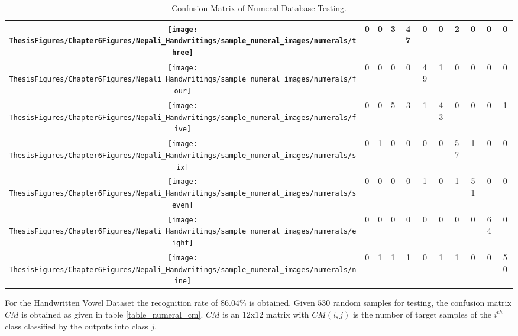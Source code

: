 \begin{table}[h]
\begin{tabular}{|c|c|c|c|c|c|c|c|c|c|c|}
\hline 
\texttt{[image: ThesisFigures/Chapter6Figures/Nepali\_Handwritings/sample\_numeral\_images/numerals/three]} & 0 & 0 & 3 & 47 & 0 & 0 & 2 & 0 & 0 & 0\tabularnewline
\hline 
\texttt{[image: ThesisFigures/Chapter6Figures/Nepali\_Handwritings/sample\_numeral\_images/numerals/four]} & 0 & 0 & 0 & 0 & 49 & 1 & 0 & 0 & 0 & 0\tabularnewline
\hline 
\texttt{[image: ThesisFigures/Chapter6Figures/Nepali\_Handwritings/sample\_numeral\_images/numerals/five]} & 0 & 0 & 5 & 3 & 1 & 43 & 0 & 0 & 0 & 1\tabularnewline
\hline 
\texttt{[image: ThesisFigures/Chapter6Figures/Nepali\_Handwritings/sample\_numeral\_images/numerals/six]} & 0 & 1 & 0 & 0 & 0 & 0 & 57 & 1 & 0 & 0\tabularnewline
\hline 
\texttt{[image: ThesisFigures/Chapter6Figures/Nepali\_Handwritings/sample\_numeral\_images/numerals/seven]} & 0 & 0 & 0 & 0 & 1 & 0 & 1 & 51 & 0 & 0\tabularnewline
\hline 
\texttt{[image: ThesisFigures/Chapter6Figures/Nepali\_Handwritings/sample\_numeral\_images/numerals/eight]} & 0 & 0 & 0 & 0 & 0 & 0 & 0 & 0 & 64 & 0\tabularnewline
\hline 
\texttt{[image: ThesisFigures/Chapter6Figures/Nepali\_Handwritings/sample\_numeral\_images/numerals/nine]} & 0 & 1 & 1 & 1 & 0 & 1 & 1 & 0 & 0 & 50\tabularnewline
\hline 
\end{tabular}
\caption{Confusion Matrix of Numeral Database Testing.}
\end{table}

For the Handwritten Vowel Dataset the recognition rate of $86.04\%$ is obtained. Given $530$ random samples for testing, the confusion matrix $CM$ is obtained as given in table \ref{table_numeral_cm}. $CM$ is an $12$x$12$ matrix with $CM(i,j)$ is the number of target samples of the $i^{th}$ class classified by the outputs into class $j$.

